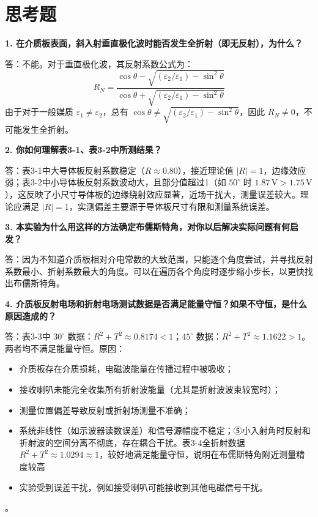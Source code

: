 \documentclass{../ElectromagneticFieldTemplate}
\begin{document}
\section{思考题}


\textbf{1. 在介质板表面，斜入射垂直极化波时能否发生全折射（即无反射），为什么？}

答：不能。对于垂直极化波，其反射系数公式为：
\[
R_N = \frac{\cos\theta - \sqrt{(\varepsilon_2/\varepsilon_1) - \sin^2\theta}}{\cos\theta + \sqrt{(\varepsilon_2/\varepsilon_1) - \sin^2\theta}}
\]
由于对于一般媒质 \(\varepsilon_1 \neq \varepsilon_2\)，总有 \(\cos\theta \neq \sqrt{(\varepsilon_2/\varepsilon_1) - \sin^2\theta}\)，因此 \(R_N \neq 0\)，不可能发生全折射。

\textbf{2. 你如何理解表3-1、表3-2中所测结果？}

答：表3-1中大导体板反射系数稳定（\(R \approx 0.80\)），接近理论值 \(|R|=1\)，边缘效应弱；表3-2中小导体板反射系数波动大，且部分值超过1（如 \(50^\circ\) 时 \(1.87\,\text{V} > 1.75\,\text{V}\)），这反映了小尺寸导体板的边缘绕射效应显著，近场干扰大，测量误差较大。理论应满足 \(|R|=1\)，实测偏差主要源于导体板尺寸有限和测量系统误差。

\textbf{3. 本实验为什么用这样的方法确定布儒斯特角，对你以后解决实际问题有何启发？}

答：因为不知道介质板相对介电常数的大致范围，只能逐个角度尝试，并寻找反射系数最小、折射系数最大的角度。可以在遍历各个角度时逐步缩小步长，以更快找出布儒斯特角。

\textbf{4. 介质板反射电场和折射电场测试数据是否满足能量守恒？如果不守恒，是什么原因造成的？}

答：表3-3中 \(30^\circ\) 数据：\(R^2+T^2 \approx 0.8174 < 1\)；\(45^\circ\) 数据：\(R^2+T^2 \approx 1.1622 > 1\)。两者均不满足能量守恒。原因：\begin{itemize}
    \item 介质板存在介质损耗，电磁波能量在传播过程中被吸收；
    \item 接收喇叭未能完全收集所有折射波能量（尤其是折射波波束较宽时）；
    \item 测量位置偏差导致反射或折射场测量不准确；
    \item 系统非线性（如示波器读数误差）和信号源幅度不稳定；⑤小入射角时反射和折射波的空间分离不彻底，存在耦合干扰。表3-4全折射数据 \(R^2+T^2 \approx 1.0294 \approx 1\)，较好地满足能量守恒，说明在布儒斯特角附近测量精度较高
    \item 实验受到误差干扰，例如接受喇叭可能接收到其他电磁信号干扰。
\end{itemize}。
\end{document}
